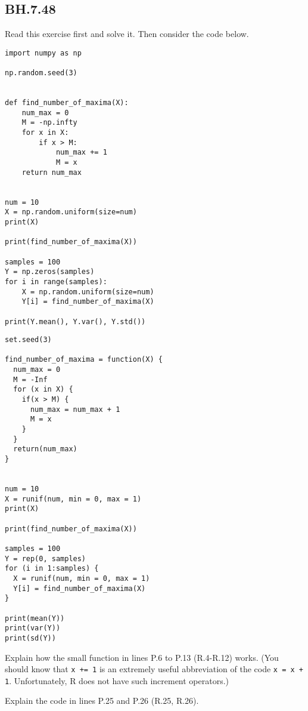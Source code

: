\subsection{BH.7.48} Read this exercise first and solve it. Then consider the code below.

\begin{verbatim}
import numpy as np

np.random.seed(3)


def find_number_of_maxima(X):
    num_max = 0
    M = -np.infty
    for x in X:
        if x > M:
            num_max += 1
            M = x
    return num_max


num = 10
X = np.random.uniform(size=num)
print(X)

print(find_number_of_maxima(X))

samples = 100
Y = np.zeros(samples)
for i in range(samples):
    X = np.random.uniform(size=num)
    Y[i] = find_number_of_maxima(X)

print(Y.mean(), Y.var(), Y.std())
\end{verbatim}


\begin{verbatim}
set.seed(3)

find_number_of_maxima = function(X) {
  num_max = 0
  M = -Inf
  for (x in X) {
    if(x > M) {
      num_max = num_max + 1
      M = x
    }
  }
  return(num_max)
}


num = 10
X = runif(num, min = 0, max = 1)
print(X)

print(find_number_of_maxima(X))

samples = 100
Y = rep(0, samples)
for (i in 1:samples) {
  X = runif(num, min = 0, max = 1)
  Y[i] = find_number_of_maxima(X)
}

print(mean(Y))
print(var(Y))
print(sd(Y))
\end{verbatim}

\begin{exercise}
Explain how the small function in lines P.6 to P.13 (R.4-R.12) works.
(You should know that \texttt{x += 1} is an extremely useful abbreviation of the code \texttt{x = x + 1}. Unfortunately, R does not have such increment operators.)
\end{exercise}

\begin{exercise}
Explain the code in lines P.25 and P.26 (R.25, R.26).
\end{exercise}
